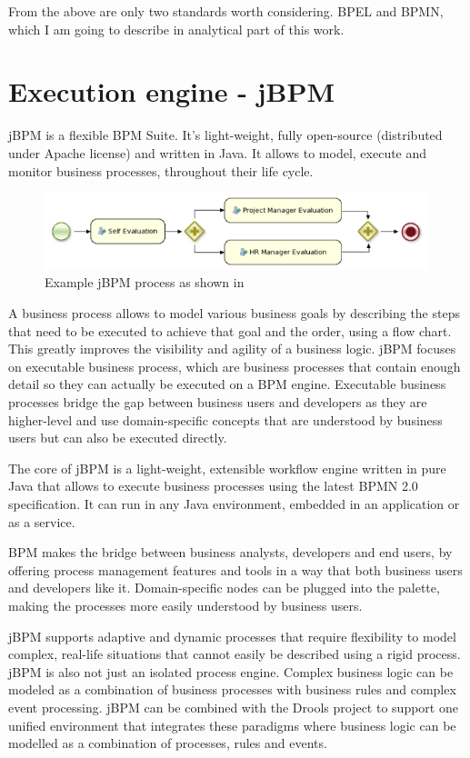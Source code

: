 	From the above are only two standards worth considering. BPEL and BPMN, which I am going to describe in analytical part
	of this work.

	\section{Execution engine - jBPM}
	
	\cite{jbpm}
	jBPM is a flexible \gls{BPM} Suite. It's light-weight, fully open-source (distributed under
	Apache license) and written in Java. It allows to model, execute and monitor business processes, throughout their life
	cycle.
	
	\begin{figure}[h]
	  	\centering
	    \includegraphics[width=12cm]{figures/jbpm_process.png}
	  	\caption{Example jBPM process as shown in \cite{jbpm}}
	\end{figure}
	
	A business process allows to model various business goals by describing the steps that need to be executed to achieve
	that goal and the order, using a flow chart. This greatly improves the visibility and agility of a business logic.
	jBPM focuses on executable business process, which are business processes that contain enough detail so they can
	actually be executed on a BPM engine. Executable business processes bridge the gap between business users and
	developers as they are higher-level and use domain-specific concepts that are understood by business users but can also
	be executed directly.

	The core of jBPM is a light-weight, extensible workflow engine written in pure Java that allows to execute business
	processes using the latest \gls{BPMN} 2.0 specification. It can run in any Java environment, embedded in an application
	or as a service.

	BPM makes the bridge between business analysts, developers and end users, by offering process management features and
	tools in a way that both business users and developers like it. Domain-specific nodes can be plugged into the palette,
	making the processes more easily understood by business users.

	jBPM supports adaptive and dynamic processes that require flexibility to model complex, real-life situations that
	cannot easily be described using a rigid process. jBPM is also not just an isolated process engine. Complex business
	logic can be modeled as a combination of business processes with business rules and complex event processing. jBPM can
	be combined with the Drools project to support one unified environment that integrates these paradigms where business
	logic can be modelled as a combination of processes, rules and events.

